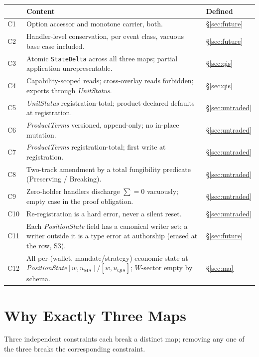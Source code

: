 \documentclass[11pt,a4paper]{article}
\begin{document}
\begin{longtable}{p{1.2cm}p{10.6cm}p{1.8cm}}
\toprule
\textbf{} & \textbf{Content} & \textbf{Defined} \\
\midrule
C1 & Option accessor and monotone carrier, both. & \S\ref{sec:future} \\
C2 & Handler-level conservation, per event class, vacuous base case included. &
\S\ref{sec:future} \\
C3 & Atomic \texttt{StateDelta} across all three maps; partial application unrepresentable. &
\S\ref{sec:qis} \\
C4 & Capability-scoped reads; cross-overlay reads forbidden; exports through
\emph{UnitStatus}. & \S\ref{sec:qis} \\
C5 & \emph{UnitStatus} registration-total; product-declared defaults at registration. &
\S\ref{sec:untraded} \\
C6 & \emph{ProductTerms} versioned, append-only; no in-place mutation. &
\S\ref{sec:untraded} \\
C7 & \emph{ProductTerms} registration-total; first write at registration. &
\S\ref{sec:untraded} \\
C8 & Two-track amendment by a total fungibility predicate (Preserving / Breaking). &
\S\ref{sec:untraded} \\
C9 & Zero-holder handlers discharge $\sum=0$ vacuously; empty case in the proof obligation. &
\S\ref{sec:untraded} \\
C10 & Re-registration is a hard error, never a silent reset. & \S\ref{sec:untraded} \\
C11 & Each \emph{PositionState} field has a canonical writer set; a writer outside it is a
type error at authorship (erased at the row, S3). & \S\ref{sec:future} \\
C12 & All per-(wallet, mandate/strategy) economic state at
\emph{PositionState}$[w,u_{\mathrm{MA}}]$/$[w,u_{\mathrm{QIS}}]$; $W$-sector empty by schema. &
\S\ref{sec:ma} \\
\bottomrule
\end{longtable}

\section{Why Exactly Three Maps}
\label{sec:why-three}

Three independent constraints each break a distinct map; removing any one of the three
breaks the corresponding constraint.
\end{document}
